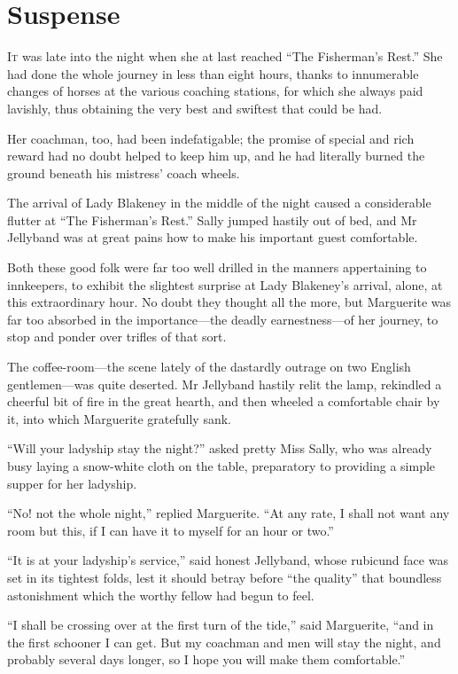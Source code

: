 
\chapter{Suspense}
\lettrine[lines=4]{I}{t} was late into the night when she at last reached \enquote{The Fisherman's Rest.} She had done the whole journey in less than eight hours, thanks to innumerable changes of horses at the various coaching stations, for which she always paid lavishly, thus obtaining the very best and swiftest that could be had.

Her coachman, too, had been indefatigable; the promise of special and rich reward had no doubt helped to keep him up, and he had literally burned the ground beneath his mistress’ coach wheels.

The arrival of Lady Blakeney in the middle of the night caused a considerable flutter at \enquote{The Fisherman's Rest.} Sally jumped hastily out of bed, and Mr Jellyband was at great pains how to make his important guest comfortable.

Both these good folk were far too well drilled in the manners appertaining to innkeepers, to exhibit the slightest surprise at Lady Blakeney's arrival, alone, at this extraordinary hour. No doubt they thought all the more, but Marguerite was far too absorbed in the importance---the deadly earnestness---of her journey, to stop and ponder over trifles of that sort.

The coffee-room---the scene lately of the dastardly outrage on two English gentlemen---was quite deserted. Mr Jellyband hastily relit the lamp, rekindled a cheerful bit of fire in the great hearth, and then wheeled a comfortable chair by it, into which Marguerite gratefully sank.

\enquote{Will your ladyship stay the night?} asked pretty Miss Sally, who was already busy laying a snow-white cloth on the table, preparatory to providing a simple supper for her ladyship.

\enquote{No! not the whole night,} replied Marguerite. \enquote{At any rate, I shall not want any room but this, if I can have it to myself for an hour or two.}

\enquote{It is at your ladyship's service,} said honest Jellyband, whose rubicund face was set in its tightest folds, lest it should betray before \enquote{the quality} that boundless astonishment which the worthy fellow had begun to feel.

\enquote{I shall be crossing over at the first turn of the tide,} said Marguerite, \enquote{and in the first schooner I can get. But my coachman and men will stay the night, and probably several days longer, so I hope you will make them comfortable.}

